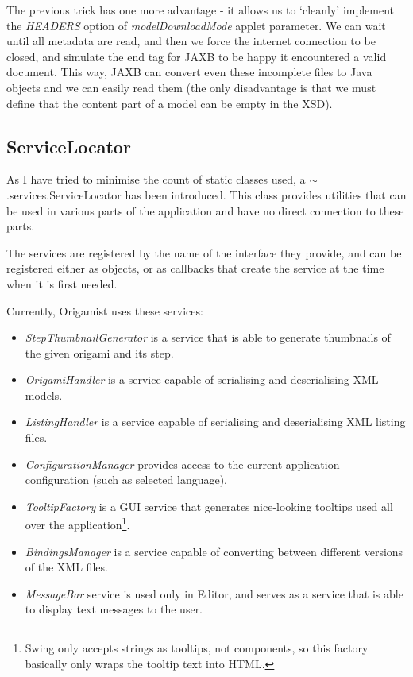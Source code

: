The previous trick has one more advantage - it allows us to `cleanly' implement the \emph{HEADERS} option of \emph{modelDownloadMode} applet parameter. We can wait until all metadata are read, and then we force the internet connection to be closed, and simulate the end tag for JAXB to be happy it encountered a valid document. This way, JAXB can convert even these incomplete files to Java objects and we can easily read them (the only disadvantage is that we must define that the content part of a model can be empty in the XSD).

\subsection{ServiceLocator}
As I have tried to minimise the count of static classes used, a $\sim$.services.ServiceLocator has been introduced. This class provides utilities that can be used in various parts of the application and have no direct connection to these parts. 

The services are registered by the name of the interface they provide, and can be registered either as objects, or as callbacks that create the service at the time when it is first needed.

Currently, Origamist uses these services:
\begin{itemize}
\item \emph{StepThumbnailGenerator} is a service that is able to generate thumbnails of the given origami and its step.
\item \emph{OrigamiHandler} is a service capable of serialising and deserialising XML models.
\item \emph{ListingHandler} is a service capable of serialising and deserialising XML listing files.
\item \emph{ConfigurationManager} provides access to the current application configuration (such as selected language).
\item \emph{TooltipFactory} is a GUI service that generates nice-looking tooltips used all over the application\footnote{Swing only accepts strings as tooltips, not components, so this factory basically only wraps the tooltip text into HTML.}.
\item \emph{BindingsManager} is a service capable of converting between different versions of the XML files.
\item \emph{MessageBar} service is used only in Editor, and serves as a service that is able to display text messages to the user.
\end{itemize}

